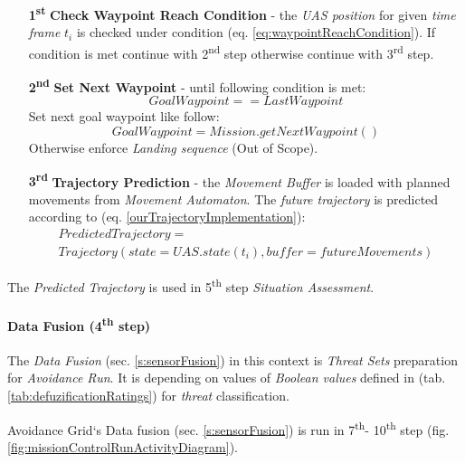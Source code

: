 \begin{itemize}
    \item[\textbf{1\textsuperscript{st}}] \textbf{Check Waypoint Reach Condition} - the \emph{UAS position} for given \emph{time frame} $t_i$ is checked under condition (eq. \ref{eq:waypointReachCondition}).  If condition is met continue with 2\textsuperscript{nd} step otherwise continue with 3\textsuperscript{rd} step.

    \item[\textbf{2\textsuperscript{nd}}] \textbf{Set Next Waypoint} - until following condition is met:
    \begin{equation*}
        Goal Waypoint == Last Waypoint    
    \end{equation*}
    Set next goal waypoint like follow:
    \begin{equation*}
        Goal Waypoint = Mission.get Next Waypoint()
    \end{equation*}
    Otherwise enforce \emph{Landing sequence} (Out of Scope).
        
    \item[\textbf{3\textsuperscript{rd}}] \textbf{Trajectory Prediction} - the \emph{Movement Buffer} is loaded with planned movements from \emph{Movement Automaton}. The \emph{future trajectory} is predicted according to (eq. \ref{ourTrajectoryImplementation}):
    \begin{multline*}
        Predicted Trajectory = \\Trajectory(state=UAS.state(t_i),buffer=future Movements)
    \end{multline*}
\end{itemize}

\noindent The \emph{Predicted Trajectory} is used in 5\textsuperscript{th} step \emph{Situation Assessment}.

\paragraph{Data Fusion (4\textsuperscript{th} step)} The \emph{Data Fusion} (sec. \ref{s:sensorFusion}) in this context is \emph{Threat Sets} preparation for \emph{Avoidance Run}. It is depending on values of \emph{Boolean values} defined in (tab. \ref{tab:defuzificationRatings}) for \emph{threat} classification.

\begin{note}
    Avoidance Grid`s Data fusion (sec. \ref{s:sensorFusion}) is run in 7\textsuperscript{th}- 10\textsuperscript{th} step (fig. \ref{fig:missionControlRunActivityDiagram}). 
\end{note}

